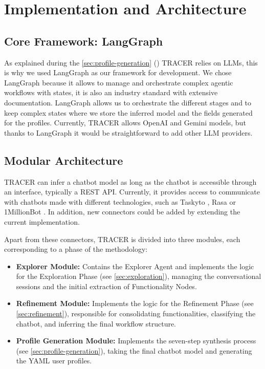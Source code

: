 \section{Implementation and Architecture}

\subsection{Core Framework: LangGraph}

As explained during the \autoref{sec:profile-generation} ()
\ac{TRACER} relies on \acp{LLM},
this is why we used LangGraph \autocite{LangGraph} as our framework for development.
We chose LangGraph because
it allows to manage and orchestrate
complex agentic workflows with states,
it is also an industry standard with extensive documentation.
LangGraph allows us to orchestrate the different stages
and to keep complex states where we store
the inferred model and the fields generated for the profiles.
Currently, \ac{TRACER} allows OpenAI and Gemini models,
but thanks to LangGraph it would be straightforward to add other \ac{LLM} providers.

\subsection{Modular Architecture}

\ac{TRACER} can infer a chatbot model as long as
the chatbot is accessible through an interface, typically a \acs{REST} \acs{API}.
Currently, it provides access to communicate with chatbots made with different technologies,
such as Taskyto \autocite{sanchezcuadradoAutomatingDevelopmentTaskoriented2024}, Rasa \autocite{Rasa2020} or 1MillionBot \autocite{1MillionBot}.
In addition, new connectors could be added by extending the current implementation.

Apart from these connectors,
\ac{TRACER} is divided into three modules,
each corresponding to a phase of the methodology:

\begin{itemize}
  \item \textbf{Explorer Module:}
    Contains the Explorer Agent
    and implements the logic for the Exploration Phase (see \autoref{sec:exploration}),
    managing the conversational sessions and the initial extraction of Functionality Nodes.

  \item \textbf{Refinement Module:}
    Implements the logic for the Refinement Phase (see \autoref{sec:refinement}),
    responsible for consolidating functionalities,
    classifying the chatbot, and inferring the final workflow structure.

  \item \textbf{Profile Generation Module:}
    Implements the seven-step synthesis process (see \autoref{sec:profile-generation}),
    taking the final chatbot model and generating the YAML user profiles.
\end{itemize}

